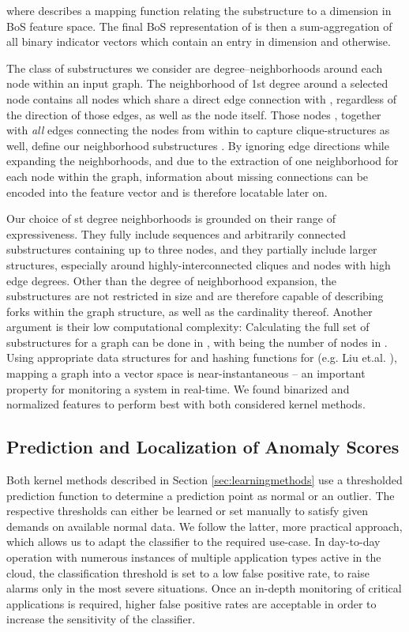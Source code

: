 \documentclass{llncs}
\begin{document}
where  describes a mapping function relating the substructure  to a dimension  in BoS feature space. The final BoS representation of  is then a sum-aggregation of all binary indicator vectors  which contain an entry  in dimension  and  otherwise. 

The class of substructures we consider are degree--neighborhoods around each node within an input graph. The neighborhood of 1st degree around a selected node  contains all nodes  which share a direct edge connection with , regardless of the direction of those edges, as well as the node  itself. Those nodes , together with \emph{all} edges  connecting the nodes from within  to capture clique-structures as well, define our neighborhood substructures . By ignoring edge directions while expanding the neighborhoods, and due to the extraction of one neighborhood for each node within the graph, information about missing connections can be encoded into the feature vector and is therefore locatable later on. 

Our choice of st degree neighborhoods is grounded on their range of expressiveness. They fully include sequences and arbitrarily connected substructures containing up to three nodes, and they partially include larger structures, especially around highly-interconnected cliques and nodes with high edge degrees. Other than the degree of neighborhood expansion, the substructures are not restricted in size and are therefore capable of describing forks within the graph structure, as well as the cardinality thereof. Another argument is their low computational complexity: Calculating the full set of substructures for a graph  can be done in , with  being the number of nodes in . Using appropriate data structures for  and hashing functions for  (e.g. Liu et.al. \cite{LiuWanKumCha11}), mapping a graph into a vector space is near-instantaneous -- an important property for monitoring a system in real-time. We found binarized and normalized features to perform best with both considered kernel methods.







 
\subsection{Prediction and Localization of Anomaly Scores}
\label{sec:pred}

Both kernel methods described in Section \ref{sec:learningmethods} use a thresholded prediction function  to determine a prediction point  as normal or an outlier.
The respective thresholds can either be learned \cite{scholkopf1999support,tax2004support} or set manually to satisfy given demands on available normal data. We follow the latter, more practical approach, which allows us to adapt the classifier to the required use-case. In day-to-day operation with numerous instances of multiple application types active in the cloud, the classification threshold is set to a low false positive rate, to raise alarms only in the most severe situations. Once an in-depth monitoring of critical applications is required, higher false positive rates are acceptable in order to increase the sensitivity of the classifier.
\end{document}
